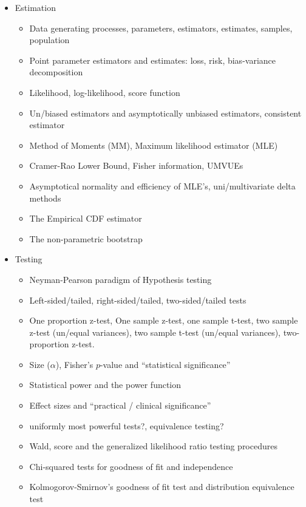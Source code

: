 \documentclass[12pt]{article}
\newcommand{\qu}[1]{``#1''}
\begin{document}
\begin{itemize}
\itemsep -0.0em 
\item Estimation
\begin{itemize}
\item Data generating processes, parameters, estimators, estimates, samples, population 
\item Point parameter estimators and estimates: loss, risk, bias-variance decomposition
\item Likelihood, log-likelihood, score function
\item Un/biased estimators and asymptotically unbiased estimators, consistent estimator
\item Method of Moments (MM), Maximum likelihood estimator (MLE)
\item Cramer-Rao Lower Bound, Fisher information, UMVUEs
\item Asymptotical normality and efficiency of MLE's, uni/multivariate delta methods
\item The Empirical CDF estimator
\item The non-parametric bootstrap
\end{itemize}
\item Testing
\begin{itemize}
\item Neyman-Pearson paradigm of Hypothesis testing
\item Left-sided/tailed, right-sided/tailed, two-sided/tailed tests
\item One proportion z-test, One sample z-test, one sample t-test, two sample z-test (un/equal variances), two sample t-test  (un/equal variances), two-proportion z-test.
\item Size ($\alpha$), Fisher's $p$-value and \qu{statistical significance}
\item Statistical power and the power function
\item Effect sizes and \qu{practical / clinical significance}
\item uniformly most powerful tests?, equivalence testing?
\item Wald, score and the generalized likelihood ratio testing procedures
\item Chi-squared tests for goodness of fit and independence
\item Kolmogorov-Smirnov's goodness of fit test and distribution equivalence test

\end{itemize}
\end{itemize}
\end{document}
